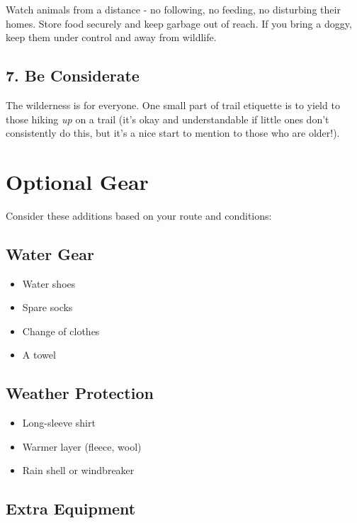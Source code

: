 \documentclass[
  letterpaper,
  DIV=11,
  numbers=noendperiod]{scrreprt}
\providecommand{\tightlist}{%
  \setlength{\itemsep}{0pt}\setlength{\parskip}{0pt}}\usepackage{longtable,booktabs,array}
\begin{document}
Watch animals from a distance - no following, no feeding, no disturbing
their homes. Store food securely and keep garbage out of reach. If you
bring a doggy, keep them under control and away from wildlife.

\subsection{7. Be Considerate}\label{be-considerate}

The wilderness is for everyone. One small part of trail etiquette is to
yield to those hiking \emph{up} on a trail (it's okay and understandable
if little ones don't consistently do this, but it's a nice start to
mention to those who are older!).

\section{Optional Gear}\label{optional-gear}

Consider these additions based on your route and conditions:

\subsection{Water Gear}\label{water-gear}

\begin{itemize}
\tightlist
\item
  Water shoes
\item
  Spare socks
\item
  Change of clothes
\item
  A towel
\end{itemize}

\subsection{Weather Protection}\label{weather-protection}

\begin{itemize}
\tightlist
\item
  Long-sleeve shirt
\item
  Warmer layer (fleece, wool)
\item
  Rain shell or windbreaker
\end{itemize}

\subsection{Extra Equipment}\label{extra-equipment}
\end{document}
